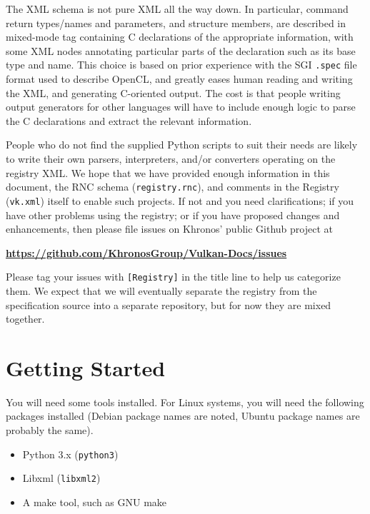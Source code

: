 \documentclass{article}
\def\code#1{{\tt #1}}
\begin{document}
The XML schema is not pure XML all the way down. In particular, command
return types/names and parameters, and structure members, are described in
mixed-mode tag containing C declarations of the appropriate information,
with some XML nodes annotating particular parts of the declaration such as
its base type and name. This choice is based on prior experience with the
SGI {\tt .spec} file format used to describe OpenCL, and greatly eases human
reading and writing the XML, and generating C-oriented output. The cost is
that people writing output generators for other languages will have to
include enough logic to parse the C declarations and extract the relevant
information.

People who do not find the supplied Python scripts to suit their needs are
likely to write their own parsers, interpreters, and/or converters operating
on the registry XML. We hope that we have provided enough information in this
document, the RNC schema ({\tt registry.rnc}), and comments in the Registry
({\tt vk.xml}) itself to enable such projects. If not and you need
clarifications; if you have other problems using the registry; or if you
have proposed changes and enhancements, then please file issues on Khronos'
public Github project at

\begin{center}
{\bf \href{https://github.com/KhronosGroup/Vulkan-Docs/issues}
          {https://github.com/KhronosGroup/Vulkan-Docs/issues}}
\end{center}

Please tag your issues with {\tt [Registry]} in the title line to help us
categorize them. We expect that we will eventually separate the registry
from the specification source into a separate repository, but for now they
are mixed together.


\section{Getting Started}
\label{starting}

You will need some tools installed.
For Linux systems, you will need the following packages installed (Debian
package names are noted, Ubuntu package names are probably the same).

\begin{itemize}
\item Python 3.x (\code{python3})
\item Libxml (\code{libxml2})
\item A make tool, such as GNU make
\end{itemize}
\end{document}

